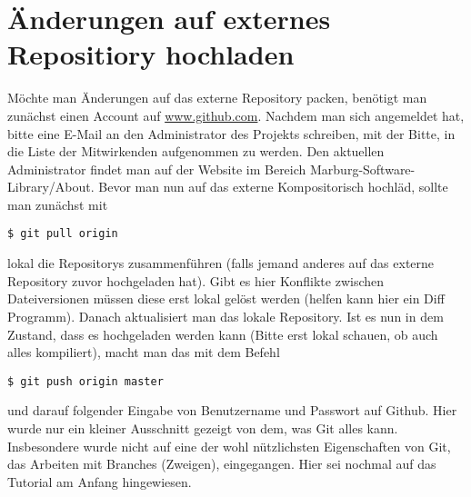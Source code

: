 \documentclass[a4paper,11pt,german]{article}
\begin{document}
\section{Änderungen auf externes Repositiory hochladen}
Möchte man Änderungen auf das externe Repository packen, benötigt man zunächst einen Account auf \url{www.github.com}. Nachdem man sich angemeldet hat, bitte eine E-Mail an den Administrator des Projekts schreiben, mit der Bitte, in die Liste der Mitwirkenden aufgenommen zu werden.
Den aktuellen Administrator findet man auf der Website im Bereich Marburg-Software-Library/About.
Bevor man nun auf das externe Kompositorisch hochläd, sollte man zunächst mit
\begin{verbatim}
$ git pull origin
\end{verbatim}
lokal die Repositorys zusammenführen (falls jemand anderes auf das externe Repository zuvor hochgeladen hat). Gibt es hier Konflikte zwischen Dateiversionen müssen diese erst lokal gelöst werden (helfen kann hier ein Diff Programm). Danach aktualisiert man das lokale Repository. Ist es nun in dem Zustand, dass es hochgeladen werden kann (Bitte erst lokal schauen, ob auch alles kompiliert), macht man das mit dem Befehl
\begin{verbatim}
$ git push origin master
\end{verbatim}
und darauf folgender Eingabe von Benutzername und Passwort auf Github.
Hier wurde nur ein kleiner Ausschnitt gezeigt von dem, was Git alles kann. Insbesondere wurde nicht auf eine der wohl nützlichsten Eigenschaften von Git, das Arbeiten mit Branches (Zweigen), eingegangen. Hier sei nochmal auf das Tutorial am Anfang hingewiesen.
\end{document}

